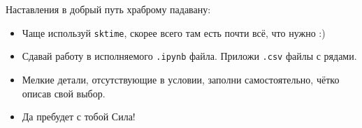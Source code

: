 \documentclass[12pt]{article}
\begin{document}
Наставления в добрый путь храброму падавану:
\begin{itemize}
    \item Чаще используй \verb|sktime|, скорее всего там есть почти всё, что нужно :)
    \item Сдавай работу в исполняемого \verb|.ipynb| файла. Приложи \verb|.csv| файлы с рядами. 
    \item Мелкие детали, отсутствующие в условии, заполни самостоятельно, чётко описав свой выбор.
    \item Да пребудет с тобой Сила!
\end{itemize}
\end{document}
